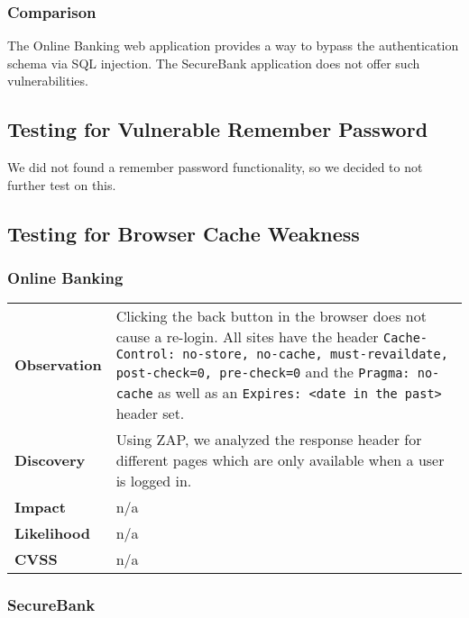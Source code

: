 \subsubsection*{Comparison}
The Online Banking web application provides a way to bypass the authentication schema via SQL injection. The SecureBank application does not offer such vulnerabilities.

\clearpage

\subsection{Testing for Vulnerable Remember Password}
We did not found a remember password functionality, so we decided to not further test on this.

\clearpage

\subsection{Testing for Browser Cache Weakness}

\subsubsection*{Online Banking}

\begin{tabular}{l|p{10cm}}

\textbf{Observation} & Clicking the back button in the browser does not cause a re-login. All sites have the header \texttt{Cache-Control: no-store, no-cache, must-revaildate, post-check=0, pre-check=0} and the \texttt{Pragma: no-cache} as well as an \texttt{Expires: <date in the past>} header set. \\
\textbf{Discovery} & Using ZAP, we analyzed the response header for different pages which are only available when a user is logged in.\\
\textbf{Impact} & n/a \\
\textbf{Likelihood} & n/a \\
\textbf{CVSS} & n/a \\
\end{tabular}

\subsubsection*{SecureBank}

